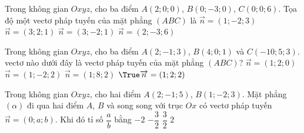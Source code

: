 \begin{ex}%
	Trong không gian $Oxyz$, cho ba điểm $A(2;0;0)$, $B(0;-3;0)$, $C(0;0;6)$. Tọa độ một vectơ pháp tuyến của mặt phẳng $(ABC)$ là
	\choice
	{$\overrightarrow{n}=(1;-2;3)$}
	{$\overrightarrow{n}=(3;2;1)$}
	{\True $\overrightarrow{n}=(3;-2;1)$}
	{$\overrightarrow{n}=(2;-3;6)$}
\end{ex}

\begin{ex}
	Trong không gian $Oxyz$, cho ba điểm $A(2;-1;3)$, $B(4;0;1)$ và $C(-10;5;3)$. vectơ nào dưới đây là vectơ pháp tuyến của mặt phẳng $(ABC)$?
	\choice
	{$\overrightarrow{n}=(1;2;0)$}
	{$\overrightarrow{n}=(1;-2;2)$}
	{$\overrightarrow{n}=(1;8;2)$}
	{$\True \overrightarrow{n}=(1;2;2)$}
\end{ex}


\begin{ex}%
	Trong không gian $Oxyz$, cho hai điểm $A(2;-1;5)$, $B(1;-2;3)$. Mặt phẳng $(\alpha)$ đi qua hai điểm $A$, $B$ và song song với trục $Ox$ có vectơ pháp tuyến $\overrightarrow{n}=(0;a;b)$. Khi đó tỉ số $\dfrac{a}{b}$ bằng
	\choice
	{\True $-2$}
	{$-\dfrac{3}{2}$}
	{$\dfrac{3}{2}$}
	{$2$}
\end{ex}

